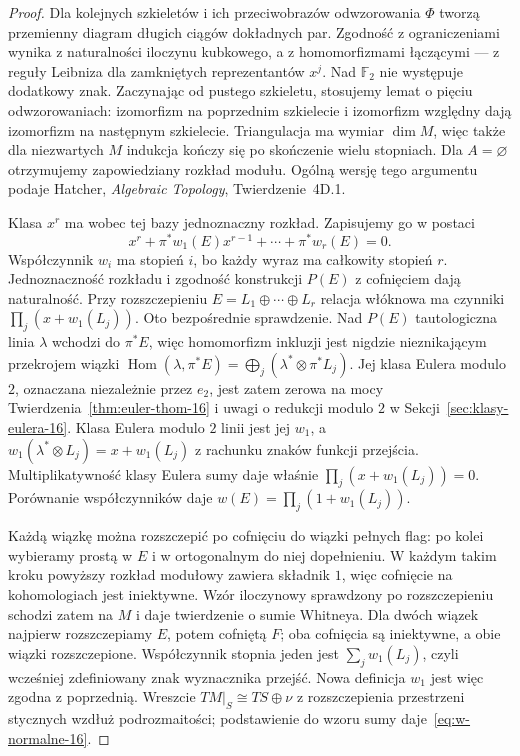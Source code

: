\begin{proof}
Dla kolejnych szkieletów i ich przeciwobrazów odwzorowania $\Phi$
tworzą przemienny diagram długich ciągów dokładnych par.
Zgodność z ograniczeniami wynika z naturalności iloczynu kubkowego,
a z homomorfizmami łączącymi --- z reguły Leibniza dla zamkniętych
reprezentantów $x^j$. Nad $\mathbb F_2$ nie występuje dodatkowy znak.
Zaczynając od pustego szkieletu, stosujemy lemat o pięciu
odwzorowaniach: izomorfizm na poprzednim szkielecie i izomorfizm
względny dają izomorfizm na następnym szkielecie.
Triangulacja ma wymiar $\dim M$, więc także dla niezwartych $M$
indukcja kończy się po skończenie wielu stopniach. Dla $A=\varnothing$
otrzymujemy zapowiedziany rozkład modułu. Ogólną wersję tego argumentu
podaje Hatcher, \emph{Algebraic Topology}, Twierdzenie~4D.1.

Klasa $x^r$ ma wobec
tej bazy jednoznaczny
rozkład. Zapisujemy
go w postaci
\[
 x^r+
   \pi^*w_1(E)x^{r-1}
     +\cdots+\pi^*w_r(E)=0.
\]
Współczynnik $w_i$
ma stopień $i$,
bo każdy wyraz ma
całkowity stopień $r$.
Jednoznaczność rozkładu
i zgodność konstrukcji
$P(E)$ z cofnięciem
dają naturalność.
Przy rozszczepieniu
$E=L_1\oplus\cdots\oplus L_r$
relacja włóknowa
ma czynniki
$\prod_j(x+w_1(L_j))$.
Oto bezpośrednie
sprawdzenie. Nad $P(E)$
tautologiczna linia
$\lambda$ wchodzi
do $\pi^*E$, więc
homomorfizm inkluzji
jest nigdzie
nieznikającym
przekrojem wiązki
$\operatorname{Hom}(\lambda,\pi^*E)
=\bigoplus_j(\lambda^*\otimes\pi^*L_j)$.
Jej klasa Eulera modulo $2$, oznaczana niezależnie
przez $e_2$, jest zatem zerowa
na mocy
Twierdzenia~\ref{thm:euler-thom-16}
i uwagi o redukcji
modulo $2$ w
Sekcji~\ref{sec:klasy-eulera-16}.
Klasa Eulera modulo $2$
linii jest jej
$w_1$, a
$w_1(\lambda^*\otimes L_j)
=x+w_1(L_j)$
z rachunku znaków
funkcji przejścia.
Multiplikatywność
klasy Eulera sumy
daje właśnie
$\prod_j(x+w_1(L_j))=0$.
Porównanie współczynników
daje
$w(E)=\prod_j(1+w_1(L_j))$.

Każdą wiązkę można
rozszczepić po cofnięciu
do wiązki pełnych flag:
po kolei wybieramy
prostą w $E$ i w
ortogonalnym do niej
dopełnieniu. W każdym
takim kroku powyższy
rozkład modułowy
zawiera składnik $1$,
więc cofnięcie
na kohomologiach
jest iniektywne.
Wzór iloczynowy
sprawdzony po
rozszczepieniu
schodzi zatem na $M$
i daje twierdzenie o sumie Whitneya. Dla dwóch
wiązek najpierw rozszczepiamy $E$, potem cofniętą $F$;
oba cofnięcia są iniektywne, a obie wiązki rozszczepione.
Współczynnik stopnia jeden jest $\sum_jw_1(L_j)$,
czyli wcześniej zdefiniowany znak wyznacznika przejść.
Nowa definicja $w_1$ jest więc zgodna z poprzednią.
Wreszcie
$TM|_S\cong TS\oplus\nu$
z rozszczepienia przestrzeni stycznych wzdłuż podrozmaitości;
podstawienie do wzoru
sumy daje~\eqref{eq:w-normalne-16}.
\end{proof}

